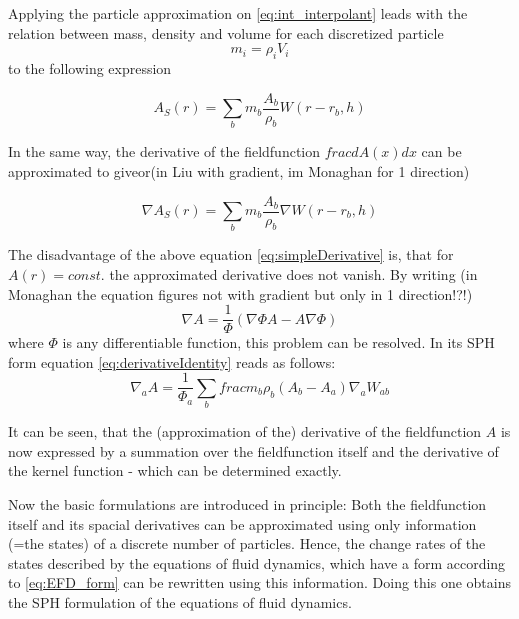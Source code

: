 \documentclass{report}
\begin{document}
Applying the particle approximation on \ref{eq:int_interpolant} leads with the
relation between mass, density and volume for each discretized particle
\begin{equation}
m_i=\rho_i V_i
\end{equation}
 to the following expression

\begin{equation}
A_S(r)=\sum_b m_b \frac{A_b}{\rho_b}W(r-r_b,h)
\end{equation}

In the same way, the derivative of the fieldfunction $frac{dA(x)}{dx}$ can be
approximated to give\cite{Monaghan2005}or\cite{Liu2003}(in Liu with gradient,
im Monaghan for 1 direction)

\begin{equation}
\label{eq:simpleDerivative}
\nabla A_S(r)=\sum_b m_b \frac{A_b}{\rho_b}\nabla W(r-r_b,h)
\end{equation}

The disadvantage of the above equation \ref{eq:simpleDerivative} is, that for
$A(r)=const.$ the approximated derivative does not vanish. By writing (in
Monaghan the equation figures not with gradient but only in 1 direction!?!)
\begin{equation}
\label{eq:derivativeIdentity}
\nabla A = \frac{1}{\Phi}(\nabla {\Phi A}-A\nabla \Phi)
\end{equation}
where $\Phi$ is any differentiable function, this problem can be resolved. In its
SPH form  equation \ref{eq:derivativeIdentity} reads as follows:
\begin{equation}
\nabla_a A = \frac{1}{\Phi_a}\sum_b frac{m_b}{\rho_b}(A_b-A_a)\nabla_a W_{ab}
\end{equation}


It can be seen, that the (approximation of the) derivative of the
fieldfunction $A$ is now expressed by a summation over the fieldfunction itself
and the derivative of the kernel function - which can be determined exactly.

Now the basic formulations are introduced in principle: Both the fieldfunction
itself and its spacial derivatives can be approximated using only information
(=the states) of a discrete number of particles. Hence, the change rates of
the states described by the equations of fluid dynamics, which have a form
according to \ref{eq:EFD_form} can be rewritten using this information. Doing
this one obtains the SPH formulation of the equations of fluid dynamics.
\end{document}
